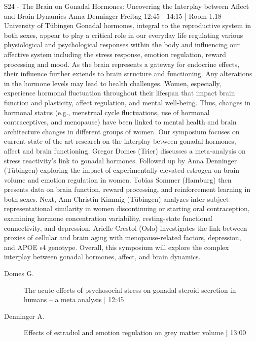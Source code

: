 
            \begin{symposium}
            {S24 - The Brain on Gonadal Hormones: Uncovering the Interplay between Affect and Brain Dynamics}
            {Anna Denninger}
            {Freitag 12:45 - 14:15 | Room 1.18}
            { University of Tübingen}
            Gonadal hormones, integral to the reproductive system in both sexes, appear to play a critical role in our everyday life regulating various physiological and psychological responses within the body and influencing our affective system including the stress response, emotion regulation, reward processing and mood. As the brain represents a gateway for endocrine effects, their influence further extends to brain structure and functioning. Any alterations in the hormone levels may lead to health challenges. Women, especially, experience hormonal fluctuation throughout their lifespan that impact brain function and plasticity, affect regulation, and mental well-being. Thus, changes in hormonal status (e.g., menstrual cycle fluctuations, use of hormonal contraceptives, and menopause) have been linked to mental health and brain architecture changes in different groups of women. Our symposium focuses on current state-of-the-art research on the interplay between gonadal hormones, affect and brain functioning. Gregor Domes (Trier) discusses a meta-analysis on stress reactivity’s link to gonadal hormones. Followed up by Anna Denninger (Tübingen) exploring the impact of experimentally elevated estrogen on brain volume and emotion regulation in women. Tobias Sommer (Hamburg) then presents data on brain function, reward processing, and reinforcement learning in both sexes. Next, Ann-Christin Kimmig (Tübingen) analyzes inter-subject representational similarity in women discontinuing or starting oral contraception, examining hormone concentration variability, resting-state functional connectivity, and depression. Arielle Crestol (Oslo) investigates the link between proxies of cellular and brain aging with menopause-related factors, depression, and APOE $\epsilon$4 genotype. Overall, this symposium will explore the complex interplay between gonadal hormones, affect, and brain dynamics.
            \begin{description}    
            
                \item [ Domes G.] The acute effects of psychosocial stress on gonadal steroid secretion in humans – a meta analysis \textcolor{mygray}{ | 12:45}    
                
                \item [ Denninger A.] Effects of estradiol and emotion regulation on grey matter volume  \textcolor{mygray}{ | 13:00}    
                

\end{description}
\end{symposium}
